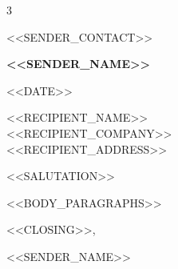 \documentclass[11pt]{article} %
\begin{document}
\begin{multicols}{3}
  \begin{flushleft}
    \color{gray}{\faEnvelope} <<SENDER_CONTACT>> \\
  \end{flushleft}
  
\columnbreak

  \begin{center}
      {\huge\bfseries <<SENDER_NAME>>} \par
  \end{center}

\columnbreak

  \begin{flushright}
  \end{flushright}
\end{multicols}

\vspace{1em}
\noindent <<DATE>>

\vspace{2em}
\noindent <<RECIPIENT_NAME>> \\
<<RECIPIENT_COMPANY>> \\
<<RECIPIENT_ADDRESS>>

\vspace{2em}
\noindent <<SALUTATION>>

\vspace{1em}
<<BODY_PARAGRAPHS>>

\vspace{2em}
\noindent <<CLOSING>>,

\vspace{2em}
\noindent <<SENDER_NAME>>
\end{document}
